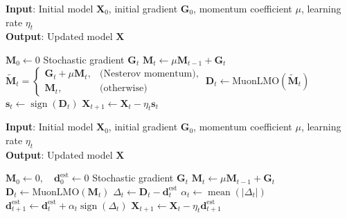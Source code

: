 \documentclass[letterpaper]{article} %
\begin{document}
\begin{algorithm}
\caption{SignMuon}
\label{central_alg}
\textbf{Input}: Initial model $\mathbf{X}_0$, initial gradient $\mathbf{G}_0$, momentum coefficient $\mu$, learning rate $\eta_t$ \\
\textbf{Output}: Updated model $\mathbf{X}$ 
\begin{algorithmic}[1]
\State $\mathbf{M}_0 \gets 0$ 
    \State Stochastic gradient $\mathbf{G}_t$
    \State $\mathbf{M}_t \gets \mu \mathbf{M}_{t-1} + \mathbf{G}_t$ 
    \State $\tilde{\mathbf{M}}_t =
    \begin{cases} 
        \mathbf{G}_t + \mu \mathbf{M}_t, & \text{(Nesterov momentum)}, \\
        \mathbf{M}_t, & \text{(otherwise)}
    \end{cases}$
    \State $\mathbf{D}_t \gets \mathrm{MuonLMO}(\tilde{\mathbf{M}}_t)$
    \State $\mathbf{s}_t \gets \operatorname{sign}(\mathbf{D}_t)$ 
    \State $\mathbf{X}_{t+1} \gets \mathbf{X}_t - \eta_t \mathbf{s}_t$ 
\EndFor
\end{algorithmic}
\end{algorithm}


\begin{algorithm}[!ht]
    \caption{EF21-SignMuon}
    \label{alg:central_ef21_signmuon}
    \textbf{Input}: Initial model $\mathbf{X}_0$, initial gradient $\mathbf{G}_0$, momentum coefficient $\mu$, learning rate $\eta_t$ \\
    \textbf{Output}: Updated model $\mathbf{X}$
    \begin{algorithmic}[1]
    \State $\mathbf{M}_0 \gets 0,\quad \mathbf{d}_0^{\mathrm{est}} \gets 0$
      \State Stochastic gradient $\mathbf{G}_t$
      \State $\mathbf{M}_t \gets \mu\mathbf{M}_{t-1} + \mathbf{G}_t$ 
      \State $\mathbf{D}_t \gets \mathrm{MuonLMO}(\mathbf{M}_t)$ 
      \State $\Delta_t \gets \mathbf{D}_t - \mathbf{d}_t^{\mathrm{est}}$ 
      \State $\alpha_t \gets \operatorname{mean}(|\Delta_t|)$ 
      \State $\mathbf{d}_{t+1}^{\mathrm{est}} \gets \mathbf{d}_t^{\mathrm{est}} + \alpha_t\operatorname{sign}(\Delta_t)$ 
      \State $\mathbf{X}_{t+1} \gets \mathbf{X}_t - \eta_t\mathbf{d}_{t+1}^{\mathrm{est}}$ 
    \EndFor
    \end{algorithmic}
\end{algorithm}
\end{document}
